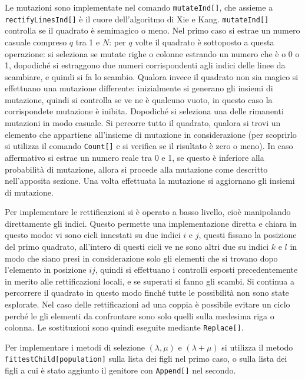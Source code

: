 \documentclass[italian,twoside,twocolumn]{article}
\begin{document}
Le mutazioni sono implementate nel comando \texttt{mutateInd[]}, che assieme a \texttt{rectifyLinesInd[]} è il cuore dell'algoritmo di Xie e Kang. \texttt{mutateInd[]} controlla se il quadrato è semimagico o meno. Nel primo caso si estrae un numero casuale compreso $ q $ tra 1 e $ N $: per $ q $ volte il quadrato è sottoposto a questa operazione: si seleziona se mutate righe o colonne estrando un numero che è o 0 o 1, dopodiché si estraggono due numeri corrispondenti agli indici delle linee da scambiare, e quindi si fa lo scambio. Qualora invece il quadrato non sia magico si effettuano una mutazione differente: inizialmente si generano gli insiemi di mutazione, quindi si controlla se ve ne è qualcuno vuoto, in questo caso la corrispondete mutazione è inibita. Dopodiché si seleziona una delle rimanenti mutazioni in modo casuale. Si percorre tutto il quadrato, qualora si trovi un elemento che appartiene all'insieme di mutazione in considerazione (per scoprirlo si utilizza il comando \texttt{Count[]} e si verifica se il risultato è zero o meno). In caso affermativo si estrae un numero reale tra 0 e 1, se questo è inferiore alla probabilità di mutazione, allora si procede alla mutazione come descritto nell'apposita sezione. Una volta effettuata la mutazione si aggiornano gli insiemi di mutazione. 

Per implementare le rettificazioni si è operato a basso livello, cioè manipolando direttamente gli indici. Questo permette una implementazione diretta e chiara in questo modo: vi sono cicli innestati su due indici $ i $ e $ j $, questi fissano la posizione del primo quadrato, all'intero di questi cicli ve ne sono altri due su indici $ k $ e $ l $ in modo che siano presi in considerazione solo gli elementi che si trovano dopo l'elemento in posizione $ ij $, quindi si effettuano i controlli esposti precedentemente in merito alle rettificazioni locali, e se superati si fanno gli scambi. Si continua a percorrere il quadrato in questo modo finché tutte le possibilità non sono state esplorate. Nel caso delle rettificazioni ad una coppia è possibile evitare un ciclo perché le gli elementi da confrontare sono solo quelli sulla medesima riga o colonna. Le sostituzioni sono quindi eseguite mediante \texttt{Replace[]}.

Per implementare i metodi di selezione $ (\lambda, \mu) $ e $ (\lambda + \mu) $ si utilizza il metodo \texttt{fittestChild[population]} sulla lista dei figli nel primo caso, o sulla lista dei figli a cui è stato aggiunto il genitore con \texttt{Append[]} nel secondo.
\end{document}
